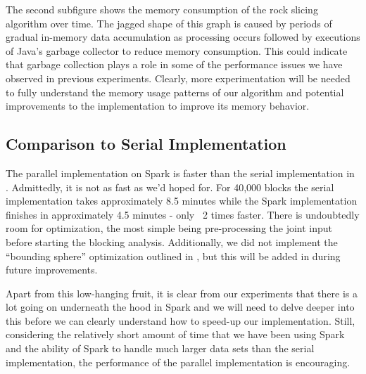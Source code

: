 The second subfigure shows the memory consumption of the rock slicing algorithm over time. The jagged shape of this graph is caused by periods of gradual in-memory data accumulation as processing occurs followed by executions of Java's garbage collector to reduce memory consumption. This could indicate that garbage collection plays a role in some of the performance issues we have observed in previous experiments. Clearly, more experimentation will be needed to fully understand the memory usage patterns of our algorithm and potential improvements to the implementation to improve its memory behavior.

\subsection{Comparison to Serial Implementation}
The parallel implementation on Spark is faster than the serial implementation in \cite{slicing}. Admittedly, it is not as fast as we'd hoped for. For 40,000 blocks the serial implementation takes approximately 8.5 minutes while the Spark implementation finishes in approximately 4.5 minutes - only ~2 times faster. There is undoubtedly room for optimization, the most simple being pre-processing the joint input before starting the blocking analysis. Additionally, we did not implement the ``bounding sphere'' optimization outlined in \cite{slicing}, but this will be added in during future improvements. 

Apart from this low-hanging fruit, it is clear from our experiments that there is a lot going on underneath the hood in Spark and we will need to delve deeper into this before we can clearly understand how to speed-up our implementation. Still, considering the relatively short amount of time that we have been using Spark and the ability of Spark to handle much larger data sets than the serial implementation, the performance of the parallel implementation is encouraging. 
